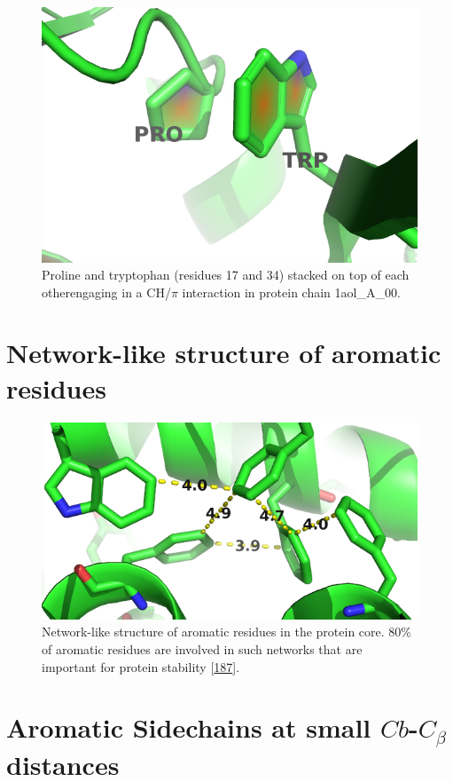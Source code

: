 \documentclass[11pt,a4paper,twoside]{book}
\newcommand{\Cb}{C_\beta}
\theoremstyle{definition}
\theoremstyle{definition}
\theoremstyle{remark}
\begin{document}
\begin{figure}
\includegraphics[width=0.5\linewidth]{img/coupling_matrix_analysis/1aolA00_17_34} \caption{Proline and
tryptophan (residues 17 and 34) stacked on top of each otherengaging in
a CH/\(\pi\) interaction in protein chain 1aol\_A\_00.}\label{fig:coupling-matrix-aromatic-proline-pymol}
\end{figure}

\section{Network-like structure of aromatic
residues}\label{aromatic-network}






\begin{figure}
\includegraphics[width=0.5\linewidth]{img/coupling_matrix_analysis/aromatic_bundle} \caption{Network-like structure of aromatic
residues in the protein core. 80\% of aromatic residues are involved in
such networks that are important for protein stability
{[}\protect\hyperlink{ref-Burley1985}{187}{]}.}\label{fig:aromatic-network}
\end{figure}

\section{\texorpdfstring{Aromatic Sidechains at small \(Cb\)-\(\Cb\)
distances}{Aromatic Sidechains at small Cb-\textbackslash{}Cb distances}}\label{aromatic-small-distances}
\end{document}
